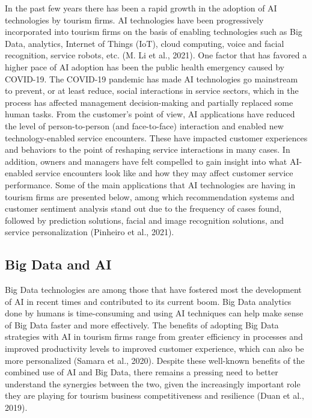 \documentclass[
  letterpaper,
  DIV=11,
  numbers=noendperiod]{scrreprt}
\begin{document}
In the past few years there has been a rapid growth in the adoption of
AI technologies by tourism firms. AI technologies have been
progressively incorporated into tourism firms on the basis of enabling
technologies such as Big Data, analytics, Internet of Things (IoT),
cloud computing, voice and facial recognition, service robots, etc. (M.
Li et al., 2021). One factor that has favored a higher pace of AI
adoption has been the public health emergency caused by COVID-19. The
COVID-19 pandemic has made AI technologies go mainstream to prevent, or
at least reduce, social interactions in service sectors, which in the
process has affected management decision-making and partially replaced
some human tasks. From the customer's point of view, AI applications
have reduced the level of person-to-person (and face-to-face)
interaction and enabled new technology-enabled service encounters. These
have impacted customer experiences and behaviors to the point of
reshaping service interactions in many cases. In addition, owners and
managers have felt compelled to gain insight into what AI-enabled
service encounters look like and how they may affect customer service
performance. Some of the main applications that AI technologies are
having in tourism firms are presented below, among which recommendation
systems and customer sentiment analysis stand out due to the frequency
of cases found, followed by prediction solutions, facial and image
recognition solutions, and service personalization (Pinheiro et al.,
2021).

\hypertarget{big-data-and-ai}{%
\subsection{Big Data and AI}\label{big-data-and-ai}}

Big Data technologies are among those that have fostered most the
development of AI in recent times and contributed to its current boom.
Big Data analytics done by humans is time-consuming and using AI
techniques can help make sense of Big Data faster and more effectively.
The benefits of adopting Big Data strategies with AI in tourism firms
range from greater efficiency in processes and improved productivity
levels to improved customer experience, which can also be more
personalized (Samara et al., 2020). Despite these well-known benefits of
the combined use of AI and Big Data, there remains a pressing need to
better understand the synergies between the two, given the increasingly
important role they are playing for tourism business competitiveness and
resilience (Duan et al., 2019).
\end{document}
